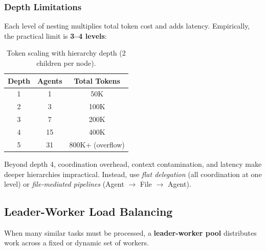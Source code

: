 \documentclass[11pt,letterpaper,twocolumn]{article}
\begin{document}
\subsubsection{Depth Limitations}

Each level of nesting multiplies total token cost and adds latency.
Empirically, the practical limit is \textbf{3--4 levels}:

\begin{table}[H]
\centering
\caption{Token scaling with hierarchy depth (2 children per node).}
\label{tab:depth-tokens}
\small
\begin{tabular}{@{}ccc@{}}
\toprule
\textbf{Depth} & \textbf{Agents} & \textbf{Total Tokens} \\
\midrule
1 & 1   & 50K \\
2 & 3   & 100K \\
3 & 7   & 200K \\
4 & 15  & 400K \\
5 & 31  & 800K+ (overflow) \\
\bottomrule
\end{tabular}
\end{table}

Beyond depth 4, coordination overhead, context contamination, and latency
make deeper hierarchies impractical.  Instead, use \emph{flat delegation}
(all coordination at one level) or \emph{file-mediated pipelines}
(Agent $\to$ File $\to$ Agent).

\subsection{Leader-Worker Load Balancing}

When many similar tasks must be processed, a \textbf{leader-worker pool}
distributes work across a fixed or dynamic set of workers.
\end{document}
